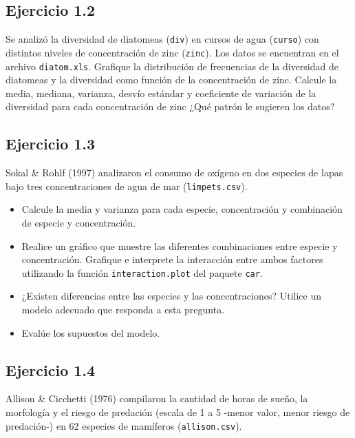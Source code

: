 \documentclass[
]{book}
\begin{document}
\hypertarget{ejercicio-1.2}{%
\subsection{Ejercicio 1.2}\label{ejercicio-1.2}}

Se analizó la diversidad de diatomeas (\texttt{div}) en cursos de agua (\texttt{curso}) con distintos niveles de concentración de zinc (\texttt{zinc}). Los datos se encuentran en el archivo \texttt{diatom.xls}. Grafique la distribución de frecuencias de la diversidad de diatomeas y la diversidad como función de la concentración de zinc. Calcule la media, mediana, varianza, desvío estándar y coeficiente de variación de la diversidad para cada concentración de zinc ¿Qué patrón le sugieren los datos?

\hypertarget{ejercicio-1.3}{%
\subsection{Ejercicio 1.3}\label{ejercicio-1.3}}

Sokal \& Rohlf (1997) analizaron el consumo de oxígeno en dos especies de lapas bajo tres concentraciones de agua de mar (\texttt{limpets.csv}).

\begin{itemize}
\item
  Calcule la media y varianza para cada especie, concentración y combinación de especie y concentración.
\item
  Realice un gráfico que muestre las diferentes combinaciones entre especie y concentración. Grafique e interprete la interacción entre ambos factores utilizando la función \texttt{interaction.plot} del paquete \texttt{car}.
\item
  ¿Existen diferencias entre las especies y las concentraciones? Utilice un modelo adecuado que responda a esta pregunta.
\item
  Evalúe los supuestos del modelo.
\end{itemize}

\hypertarget{ejercicio-1.4}{%
\subsection{Ejercicio 1.4}\label{ejercicio-1.4}}

Allison \& Cicchetti (1976) compilaron la cantidad de horas de sueño, la morfología y el riesgo de predación (escala de 1 a 5 -menor valor, menor riesgo de predación-) en 62 especies de mamíferos (\texttt{allison.csv}).
\end{document}

